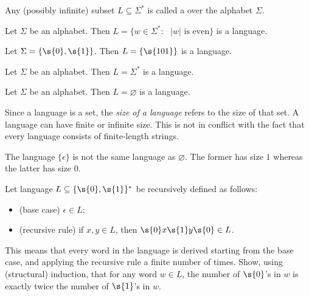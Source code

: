 \begin{definition}[Language] \label{definition:Language}
Any (possibly infinite) subset $L \subseteq \Sigma^*$ is called a  over the alphabet $\Sigma$.
\end{definition}

\begin{example} \label{example:Language-of-even-length-strings}
Let $\Sigma$ be an alphabet.
Then $L = \{w \in \Sigma^* : \text{ $|w|$ is even}\}$ is a language.
\end{example}

\begin{example} \label{example:A-language-with-one-word}
Let $\Sigma = \{\s{0},\s{1}\}$.
Then $L = \{\s{101}\}$ is a language.
\end{example}

\begin{example} \label{example:Sigma-as-a-language}
Let $\Sigma$ be an alphabet.
Then $L = \Sigma^*$ is a language.
\end{example}

\begin{example} \label{example:Empty-set-as-a-language}
Let $\Sigma$ be an alphabet.
Then $L = \varnothing$ is a language.
\end{example}

\begin{note} \label{note:Size-of-a-language}
Since a language is a set, the \emph{size of a language} refers to the size of that set. 
A language can have finite or infinite size. 
This is not in conflict with the fact that every language consists of finite-length strings. 
\end{note}

\begin{note} \label{note:varnothing-vs-epsilon}
The language $\{\epsilon\}$ is not the same language as $\varnothing$. 
The former has size $1$ whereas the latter has size $0$. 
\end{note}

\begin{exercise} \label{exercise:Structural-induction-on-words}
Let language $L \subseteq \{\s{0},\s{1}\}^*$ be recursively defined as follows:
\begin{itemize}
    \item (base case) $\epsilon \in L$;
    \item (recursive rule) if $x, y \in L$, then $\s{0}x\s{1}y\s{0} \in L$.
\end{itemize}
This means that every word in the language is derived starting from the base case, and applying the recursive rule a finite number of times. 
Show, using (structural) induction, that for any word $w \in L$, the number of $\s{0}$'s in $w$ is exactly twice the number of $\s{1}$'s in $w$.
\end{exercise}

